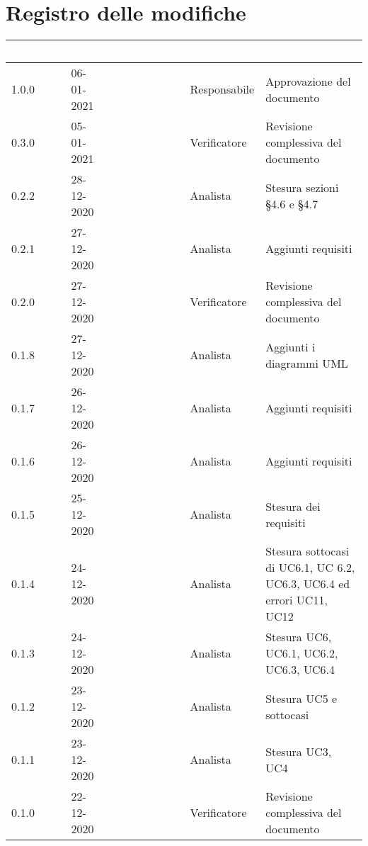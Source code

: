\section*{Registro delle modifiche}
{
\setcounter{table}{-1}
{
\renewcommand{\arraystretch}{1.5}
\centering
\begin{longtable}{C{1.7cm} C{2.5cm} C{3.2cm} C{2.7cm} C{4.8cm}}
\textcolor{white}{\textbf{Versione}}&
\textcolor{white}{\textbf{Data}}&
\textcolor{white}{\textbf{Nominativo}}&
\textcolor{white}{\textbf{Ruolo}}&
\textcolor{white}{\textbf{Descrizione}}\\	
\endhead

1.0.0 & 06-01-2021 & \BM{} & Responsabile & Approvazione del documento \\

0.3.0 & 05-01-2021 & \PA{} & Verificatore & Revisione complessiva del documento \\

0.2.2 & 28-12-2020 & \BM{} & Analista & Stesura sezioni §4.6 e §4.7\\
0.2.1 & 27-12-2020 & \SG{} & Analista & Aggiunti requisiti\\

0.2.0 & 27-12-2020 & \RA{} & Verificatore & Revisione complessiva del documento \\

0.1.8 & 27-12-2020 & \SP{} & Analista & Aggiunti i diagrammi UML\\
0.1.7 & 26-12-2020 & \SP{} & Analista & Aggiunti requisiti\\
0.1.6 & 26-12-2020 & \BM{} & Analista & Aggiunti requisiti\\
0.1.5 & 25-12-2020 & \SG{} & Analista & Stesura dei requisiti \\
0.1.4 & 24-12-2020 & \SP{} & Analista & Stesura sottocasi di UC6.1, UC 6.2, UC6.3, UC6.4 ed errori UC11, UC12\\
0.1.3 & 24-12-2020 & \SG{} & Analista & Stesura UC6, UC6.1, UC6.2, UC6.3, UC6.4\\
0.1.2 & 23-12-2020 & \SP{} & Analista & Stesura UC5 e sottocasi\\

0.1.1 & 23-12-2020 & \BM{} & Analista & Stesura UC3, UC4\\

0.1.0 & 22-12-2020 & \PA{} & Verificatore & Revisione complessiva del documento \\


\end{longtable}}}
